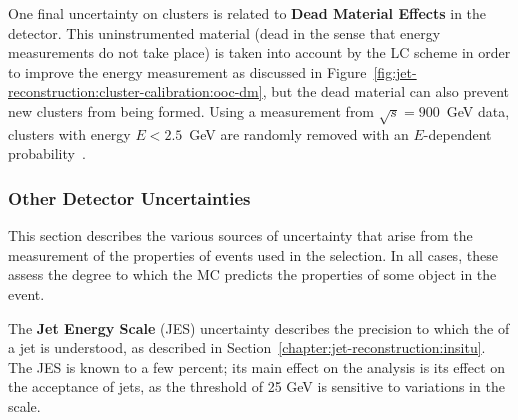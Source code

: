 


	One final uncertainty on clusters is related to \textbf{Dead Material Effects} in the detector. This uninstrumented material (dead in the sense that energy measurements do not take place) is taken into account by the LC scheme in order to improve the energy measurement as discussed in Figure~\ref{fig:jet-reconstruction:cluster-calibration:ooc-dm}, but the dead material can also prevent new clusters from being formed. Using a measurement from $\sqrt{s} = 900$~GeV data, clusters with energy $E < 2.5$~GeV  are randomly removed with an $E$-dependent probability~\cite{Aad:2012vm}.

	\subsubsection{Other Detector Uncertainties}
	\label{chapter:color:uncertainties:other}

	This section describes the various sources of uncertainty that arise from the measurement of the properties of events used in the selection. In all cases, these assess the degree to which the MC predicts the properties of some object in the event.

	The \textbf{Jet Energy Scale} (JES) uncertainty describes the precision to which the \pt of a jet is understood, as described in Section~\ref{chapter:jet-reconstruction:insitu}. The JES is known to a few percent; its main effect on the analysis is its effect on the acceptance of jets, as the \pt threshold of 25 GeV is sensitive to variations in the \pt scale.



